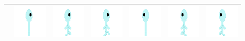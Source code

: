 \documentclass[../Main.tex]{subfiles}
\begin{document}
\begin{center}
\begin{tabular}{ | m{} | m{} m{} m{} m{} m{} m{} | }
                    & \centerline{\includegraphics[scale=3]{../res/textures/entities/followers/frost/East.png}} & \centerline{\includegraphics[scale=3]{../res/textures/entities/followers/frost/East-Walk-1.png}} & \centerline{\includegraphics[scale=3]{../res/textures/entities/followers/frost/East-Walk-2.png}} & \centerline{\includegraphics[scale=3]{../res/textures/entities/followers/frost/West.png}} & \centerline{\includegraphics[scale=3]{../res/textures/entities/followers/frost/West-Walk-1.png}} & \centerline{\includegraphics[scale=3]{../res/textures/entities/followers/frost/West-Walk-2.png}} \\
                    \hline

\end{tabular}
\end{center}
\end{document}
